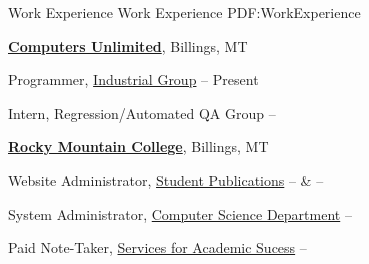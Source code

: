 \documentclass[letterpaper,MMMyyyy,nonstopmode]{simpleresumecv}
\newcommand{\CVAuthor}{Isaac Mayes}
\newcommand{\CVWebpage}{http://www.mayesid.com}
\begin{document}

\Title{\CVAuthor}

\begin{SubTitle}
\href{https://www.google.com/maps/place/Billings,+MT/}
***REMOVED***, Billings, MT 59102}
\,\SubBulletSymbol\,
***REMOVED***
\par
\href{mailto:contact@mayesid.com}
{contact@mayesid.com}
\,\SubBulletSymbol\,
\href{\CVWebpage}
{\url{\CVWebpage}}
\end{SubTitle}

\begin{Body}


\Section
{Work \newline Experience}
{Work Experience}
{PDF:WorkExperience}

\Entry
\href{http://www.cu.net}
{\textbf{Computers Unlimited}},
Billings, MT

\Gap
\BulletItem
Programmer,
\href{http://www.cu.net/industrial}
{Industrial Group}
\hfill
{} --
Present
\begin{Detail}
\end{Detail}

\Gap
\BulletItem
Intern,
Regression/Automated QA Group
\hfill
{} --
\begin{Detail}
\end{Detail}

\Entry
\href{http://www.rocky.edu}
{\textbf{Rocky Mountain College}},
Billings, MT

\Gap
\BulletItem
Website Administrator,
\href{http://summit.rocky.edu}
{Student Publications}
\hfill
{} --
 \&
 --
\begin{Detail}
\end{Detail}

\Gap
\BulletItem
System Administrator,
\href{http://cs.rocky.edu}
{Computer Science Department}
\hfill
{} --
\begin{Detail}
\end{Detail}

\Gap
\BulletItem
Paid Note-Taker,
\href{https://www.rocky.edu/student-life/student-support/academic-support/ServicesAcademicSuccess.php}
{Services for Academic Sucess}
\hfill
{} --
\begin{Detail}
\end{Detail}


\end{Body}
\end{document}
